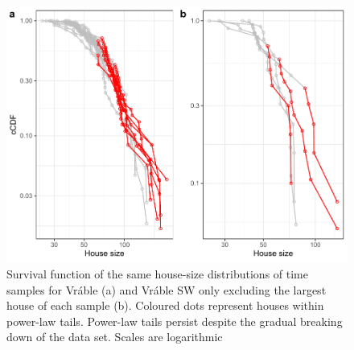 \documentclass[
  12pt,
]{book}
\begin{document}
\begin{figure}

{\centering \includegraphics[width=0.9\linewidth]{bookdown-demo_files/figure-latex/06-time-tails-1} 

}

\caption{Survival function of the same house-size distributions of time samples for Vráble (a) and Vráble SW only excluding the largest house of each sample (b). Coloured dots represent houses within power-law tails. Power-law tails persist despite the gradual breaking down of the data set. Scales are logarithmic}\label{fig:06-time-tails}
\end{figure}
\end{document}
